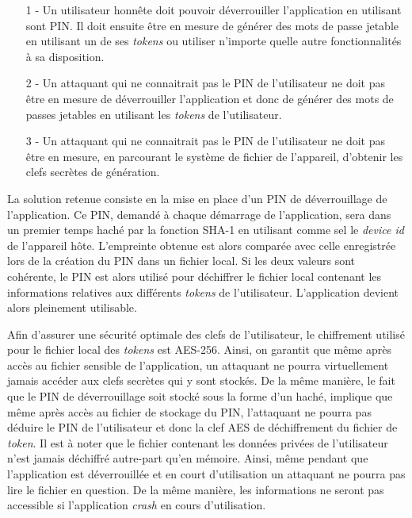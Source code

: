 \begin{itemize}
  \item[1 -] Un utilisateur honnête doit pouvoir déverrouiller l'application en utilisant
  sont PIN. Il doit ensuite être en mesure de générer des mots de passe jetable en utilisant
  un de ses \emph{tokens} ou utiliser n'importe quelle autre fonctionnalités à sa
  disposition.
  \item[2 -] Un attaquant qui ne connaitrait pas le PIN de l'utilisateur ne doit pas être en
  mesure de déverrouiller l'application et donc de générer des mots de passes jetables en
  utilisant les \emph{tokens} de l'utilisateur.
  \item[3 -] Un attaquant qui ne connaitrait pas le PIN de l'utilisateur ne doit pas être en
  mesure, en parcourant le système de fichier de l'appareil, d'obtenir les clefs secrètes
  de génération.
\end{itemize}

La solution retenue consiste en la mise en place d'un PIN de déverrouillage de l'application.
Ce PIN, demandé à chaque démarrage de l'application, sera dans un premier temps haché par la
fonction SHA-1 en utilisant comme sel le \emph{device id} de l'appareil hôte. L'empreinte
obtenue est alors comparée avec celle enregistrée lors de la création du PIN dans un fichier
local. Si les deux valeurs sont cohérente, le PIN est alors utilisé pour déchiffrer le
fichier local contenant les informations relatives aux différents \emph{tokens} de
l'utilisateur. L'application devient alors pleinement utilisable.

Afin d'assurer une sécurité optimale des clefs de l'utilisateur, le chiffrement utilisé pour
le fichier local des \emph{tokens} est AES-256. Ainsi, on garantit que même après accès au
fichier sensible de l'application, un attaquant ne pourra virtuellement jamais accéder aux
clefs secrètes qui y sont stockés. De la même manière, le fait que le PIN de déverrouillage
soit stocké sous la forme d'un haché, implique que même après accès au fichier de stockage du
PIN, l'attaquant ne pourra pas déduire le PIN de l'utilisateur et donc la clef AES de déchiffrement du fichier de \emph{token}. Il est à noter que le fichier contenant les données
privées de l'utilisateur n'est jamais déchiffré autre-part qu'en mémoire. Ainsi, même pendant
que l'application est déverrouillée et en court d'utilisation un attaquant ne pourra pas lire
le fichier en question. De la même manière, les informations ne seront pas accessible si
l'application \emph{crash} en cours d'utilisation.




